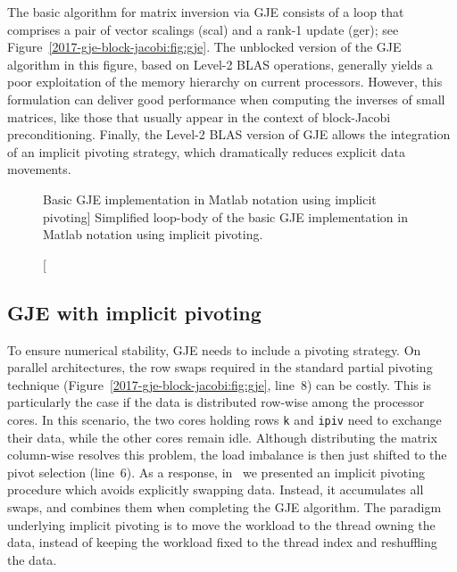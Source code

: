 The basic algorithm for matrix inversion via GJE consists of
a loop that comprises a pair of vector scalings ({\sc scal}) and a rank-1
update ({\sc ger}); see Figure~\ref{2017-gje-block-jacobi:fig:gje}.
The unblocked version of the GJE algorithm in this figure, based
on Level-2 BLAS operations,
generally yields a poor exploitation of the memory hierarchy on current processors.
However, this formulation can
deliver good performance when computing the inverses of small matrices,
like {those that usually appear}
in the context of block-Jacobi preconditioning. 
Finally, the Level-2 BLAS version of GJE allows {the integration of} an implicit pivoting strategy,
which dramatically reduces explicit data movements.


\begin{figure}[t]
\begin{center}
\begin{minipage}{\columnwidth}
{\small

}
\end{minipage}
\caption
[Basic GJE implementation in Matlab notation using implicit pivoting]
{Simplified loop-body of the basic GJE implementation in Matlab
    notation using implicit pivoting.}
\label{2017-gje-block-jacobi:fig:gje2}
\end{center}
\end{figure}

\subsection{GJE with implicit pivoting}\label{2017-gje-block-jacobi:sec:implicit-pivoting}
To ensure numerical stability, GJE needs to {include} a pivoting strategy.
On parallel architectures, the row swaps required
in the standard partial pivoting technique (Figure~\ref{2017-gje-block-jacobi:fig:gje}, line~8)
can be costly.
This is particularly the case if the data is distributed row-wise
among the processor cores.
In this {scenario}, the two cores holding rows \texttt{k} and \texttt{ipiv}
need to exchange their data, while the other cores remain idle.
Although distributing the matrix column-wise resolves this problem,
the load imbalance is then just shifted to the pivot selection (line~6).
As a response, in~\cite{Anzt:2017:BGE:3026937.3026940}
we {presented} an implicit pivoting procedure
which avoids explicitly swapping data.
Instead, it accumulates all swaps, and combines them
when completing the GJE algorithm.
The paradigm underlying implicit pivoting is to move the {workload to the thread owning the data}, instead of 
keeping the workload fixed to the thread index and reshuffling the data.

